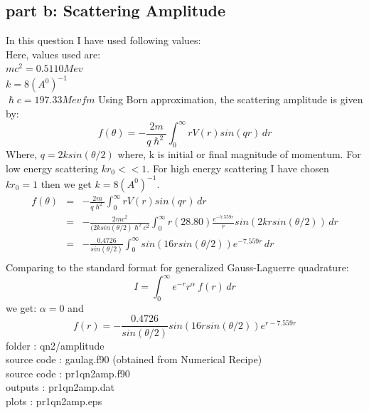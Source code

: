 \documentclass[11pt,a4paper,english]{article}
\newcommand{\no}{\nonumber}
\newcommand{\beq}{\begin{equation}}
\newcommand{\eeq}{\end{equation}}
\newcommand{\beqa}{\begin{eqnarray}}
\newcommand{\eeqa}{\end{eqnarray}}
\newcommand{\bdm}{\begin{displaymath}}
\newcommand{\edm}{\end{displaymath}}
\begin{document}
	
	\subsection{part b: Scattering Amplitude}
In this question I have used following values:\\
Here, values used are:\\
$ mc^{2} = 0.5110 Mev $\\
$ k = 8 (A^{0})^{-1} $\\
$ \hslash c = 197.33 Mev fm $
Using Born approximation, the scattering amplitude is given by:\\
\beq
f(\theta)= -\frac{2m}{q\hslash^{2}}\!\! \int_0^\infty \!\! r V(r) sin(qr) \, dr
\eeq
Where, $ q=2ksin(\theta/2) $
where, k is initial or final magnitude of momentum. For low energy scattering $ kr_{0}<< 1$.
For high energy scattering I have chosen $ kr_{0} = 1$ then we get $ k = 8 (A^{0})^{-1} $.
\beqa
f(\theta) &=& -\frac{2m}{q\hslash^{2}}\!\! \int_0^\infty \!\! r V(r) sin(qr) \, dr \\
&=& -\frac{2mc^{2}}{(2ksin(\theta/2)\hslash^{2}c^{2}}\!\! \int_0^\infty \!\! r (28.80) \frac{ e^{-7.559r}}{r} sin(2krsin(\theta/2))  \, dr \no\\
&=& -\frac{0.4726}{sin(\theta/2)}\!\! \int_0^\infty \!\! sin(16rsin(\theta/2)) e^{-7.559r}\,dr  \no\\
\eeqa
Comparing to the standard format for generalized Gauss-Laguerre quadrature:\\
\bdm
I = \int_0^\infty \!\! e^{-r}r^{\alpha}\ \!f(r)\,dr 
\edm
we get:
$\alpha = 0 $ and \\
\bdm
f(r) = -\frac{0.4726}{sin(\theta/2)} sin(16rsin(\theta/2)) e^{r-7.559r}
\edm
    folder       : qn2/amplitude\\
	source code  : gaulag.f90   (obtained from Numerical Recipe)\\
	source code  : pr1qn2amp.f90\\
	outputs      : pr1qn2amp.dat\\
	plots        : pr1qn2amp.eps\\
	
\end{document}
